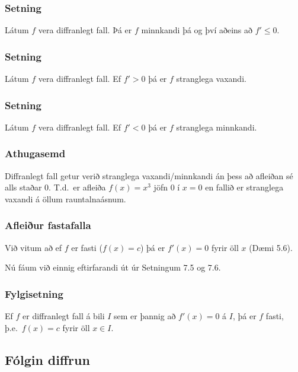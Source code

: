 \documentclass[icelandic,a4paper,12pt]{article}
\begin{document}
\subsubsection{Setning}
Látum $f$ vera diffranlegt fall. Þá er $f$ minnkandi þá og því aðeins að $f' \leq 0$.

\subsubsection{Setning} 
Látum $f$ vera diffranlegt fall. Ef $f'>0$ þá er $f$ stranglega vaxandi.

\subsubsection{Setning}
Látum $f$ vera diffranlegt fall. Ef $f'<0$ þá er $f$ stranglega minnkandi.

\subsubsection{Athugasemd} 
Diffranlegt fall getur verið stranglega vaxandi/minnkandi án þess að afleiðan
sé alls staðar 0. T.d.~er afleiða $f(x)=x^3$ jöfn 0 í $x=0$ en fallið er 
stranglega vaxandi á öllum rauntalnaásnum.

\subsubsection{Afleiður fastafalla}
Við vitum að ef $f$ er fasti ($f(x)=c$) þá er $f'(x)=0$ 
fyrir öll $x$ (Dæmi 5.6). 

Nú fáum við einnig eftirfarandi út úr Setningum 7.5 og 7.6.

\subsubsection{Fylgisetning}
Ef $f$ er diffranlegt fall á bili $I$ sem er þannig að $f'(x) = 0$
á $I$, þá er $f$ fasti, þ.e.~$f(x) = c$ fyrir öll $x\in I$.

\subsection{Fólgin diffrun}
\end{document}
